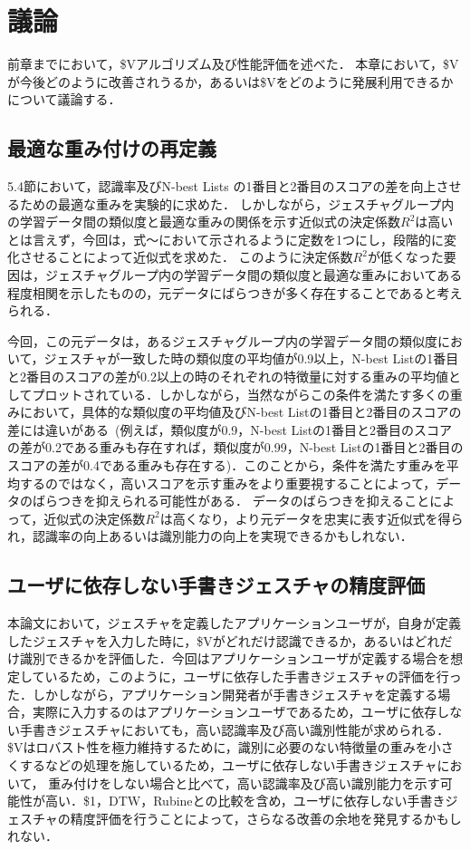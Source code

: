 \chapter{議論}
前章までにおいて，\$Vアルゴリズム及び性能評価を述べた．
本章において，\$Vが今後どのように改善されうるか，あるいは\$Vをどのように発展利用できるかについて議論する．

\section{最適な重み付けの再定義}
5.4節において，認識率及びN-best Lists の1番目と2番目のスコアの差を向上させるための最適な重みを実験的に求めた．
しかしながら，ジェスチャグループ内の学習データ間の類似度と最適な重みの関係を示す近似式の決定係数$R^2$は高いとは言えず，今回は，式〜において示されるように定数を1つにし，段階的に変化させることによって近似式を求めた．
このように決定係数$R^2$が低くなった要因は，ジェスチャグループ内の学習データ間の類似度と最適な重みにおいてある程度相関を示したものの，元データにばらつきが多く存在することであると考えられる．

今回，この元データは，あるジェスチャグループ内の学習データ間の類似度において，ジェスチャが一致した時の類似度の平均値が0.9以上，N-best Listの1番目と2番目のスコアの差が0.2以上の時のそれぞれの特徴量に対する重みの平均値としてプロットされている．しかしながら，当然ながらこの条件を満たす多くの重みにおいて，具体的な類似度の平均値及びN-best Listの1番目と2番目のスコアの差には違いがある~(例えば，類似度が0.9，N-best Listの1番目と2番目のスコアの差が0.2である重みも存在すれば，類似度が0.99，N-best Listの1番目と2番目のスコアの差が0.4である重みも存在する)．このことから，条件を満たす重みを平均するのではなく，高いスコアを示す重みをより重要視することによって，データのばらつきを抑えられる可能性がある．
データのばらつきを抑えることによって，近似式の決定係数$R^2$は高くなり，より元データを忠実に表す近似式を得られ，認識率の向上あるいは識別能力の向上を実現できるかもしれない．


\section{ユーザに依存しない手書きジェスチャの精度評価}
本論文において，ジェスチャを定義したアプリケーションユーザが，自身が定義したジェスチャを入力した時に，\$Vがどれだけ認識できるか，あるいはどれだけ識別できるかを評価した．今回はアプリケーションユーザが定義する場合を想定しているため，このように，ユーザに依存した手書きジェスチャの評価を行った．しかしながら，アプリケーション開発者が手書きジェスチャを定義する場合，実際に入力するのはアプリケーションユーザであるため，ユーザに依存しない手書きジェスチャにおいても，高い認識率及び高い識別性能が求められる．\$Vはロバスト性を極力維持するために，識別に必要のない特徴量の重みを小さくするなどの処理を施しているため，ユーザに依存しない手書きジェスチャにおいて，
重み付けをしない場合と比べて，高い認識率及び高い識別能力を示す可能性が高い．\$1，DTW，Rubineとの比較を含め，ユーザに依存しない手書きジェスチャの精度評価を行うことによって，さらなる改善の余地を発見するかもしれない．


